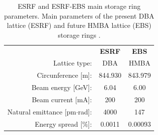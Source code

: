 \documentclass{iucr}              %
\newcommand{\todo}[1]{{\color{red}[TODO: "#1'']}}
\begin{document}
\begin{table}\label{tab:TableSources}
    \caption{ESRF and ESRF-EBS main storage ring parameters. Main parameters of the present DBA lattice (ESRF) and future HMBA lattice (EBS) storage rings \cite{orangebook}.}
        \begin{tabular}{rcc}
                                              & \textbf{ESRF} & \textbf{EBS}      \\ 
        Lattice type:                         & DBA           & HMBA              \\
        Circunference {[}m{]}:                & 844.930       & 843.979           \\
        Beam energy {[}GeV{]}:                & 6.04          & 6.00              \\
        Beam current {[}mA{]}:                & 200           & 200               \\
        Natural emittance {[}pm$\cdot$rad{]}: & 4000          & 147               \\
        Energy spread {[}$\%${]}:             & 0.0011        & 0.00093           \\       
    \end{tabular}
\end{table}

\begin{table}\label{tab:eBeam}
    \centering
    \caption{ESRF and EBS main electron beam parameters. Electron beam parameters for the high-$\beta$ (ESRF) and the EBS straight sections. Values taken at the symmetry point of the straight section, where the insertion devices are placed. Values for ESRF are taken from \cite{ESRF2014}. For EBS, two (very close) design values are used, from Ref.~\cite{ESRF2014} labelled EBS-S28A, and those coming from further lattice refinement, labelled EBS-S28D. \todo{Remove ESRF-AT and EBS-S28A} }
\end{table}
\end{document}
